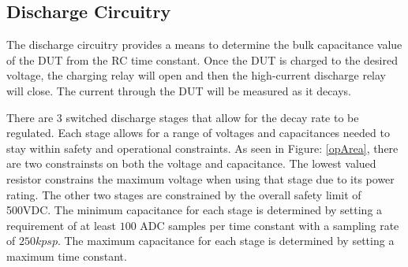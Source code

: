 \subsection{Discharge Circuitry}
The discharge circuitry provides a means to determine the bulk capacitance value of the DUT from the RC time constant. Once the DUT is charged to the desired voltage, the charging relay will open and then the high-current discharge relay will close. The current through the DUT will be measured as it decays.

There are 3 switched discharge stages that allow for the decay rate to be regulated. Each stage allows for a range of voltages and capacitances needed to stay within safety and operational constraints. As seen in Figure: \ref{opArea}, there are two constrainsts on both the voltage and capacitance. The lowest valued resistor constrains the maximum voltage when using that stage due to its power rating. The other two stages are constrained by the overall safety limit of 500VDC. The minimum capacitance for each stage is determined by setting a requirement of at least $100$ ADC samples per time constant with a sampling rate of $250kpsp$. The maximum capacitance for each stage is determined by setting a maximum time constant.


